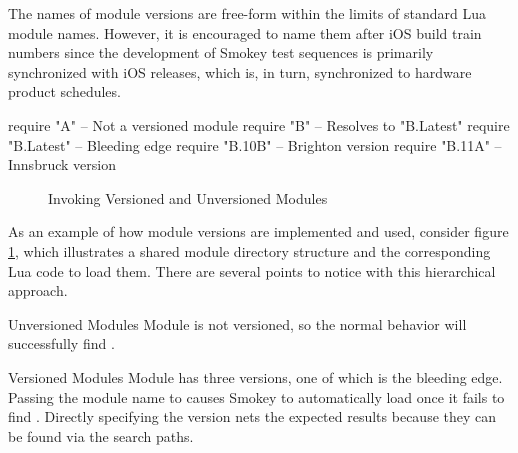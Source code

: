 The names of module versions are free-form within the limits of standard Lua
module names.  However, it is encouraged to name them after iOS build train
numbers since the development of Smokey test sequences is primarily
synchronized with iOS releases, which is, in turn, synchronized to hardware
product schedules.

\begin{lrbox}{\LeftBoxA}
\begin{NestedLuaCode}[linewidth=3in]
require "A"        -- Not a versioned module
require "B"        -- Resolves to "B.Latest"
require "B.Latest" -- Bleeding edge
require "B.10B"    -- Brighton version
require "B.11A"    -- Innsbruck version
\end{NestedLuaCode}
\end{lrbox}

\begin{figure}[h]

	\begin{SideBySideGrid}

		\begin{NestedDirectoryTree}
		\end{NestedDirectoryTree}

	\NextColumn

		\UseLuaCodeBox{\LeftBoxA}

	\LastRow
	\end{SideBySideGrid}

	\caption{Invoking Versioned and Unversioned Modules}
	\label{fig:InvokingVersionedModules}

\end{figure}

As an example of how module versions are implemented and used, consider figure
\ref{fig:InvokingVersionedModules}, which illustrates a shared module directory
structure and the corresponding Lua code to load them.  There are several
points to notice with this hierarchical approach.

\begin{Descriptive}

	\item[Unversioned Modules] Module  is not versioned, so the
	normal  behavior will successfully find
	.

	\item[Versioned Modules] Module  has three versions, one of
	which is the bleeding edge.  Passing the module name  to
	 causes Smokey to automatically load
	 once it fails to find
	.  Directly specifying the version
	nets the expected results because they can be found via the
	 search paths.

\end{Descriptive}

